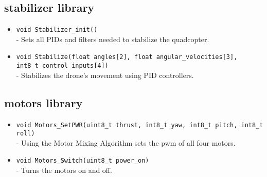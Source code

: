 \subsection{stabilizer library}
    \begin{itemize}
        \item \texttt{void Stabilizer\_init()} \\
        - Sets all PIDs and filters needed to stabilize the quadcopter.
        \item \texttt{void Stabilize(float angles[2], float angular\_velocities[3], \\
        int8\_t control\_inputs[4])} \\
        - Stabilizes the drone's movement using PID controllers.
    \end{itemize}

\subsection{motors library}
    \begin{itemize}
        \item \texttt{void Motors\_SetPWR(uint8\_t thrust, int8\_t yaw, int8\_t pitch, int8\_t roll)} \\
        - Using the Motor Mixing Algorithm sets the pwm of all four motors.
        \item  \texttt{void Motors\_Switch(uint8\_t power\_on)} \\
        - Turns the motors on and off.
    \end{itemize}

